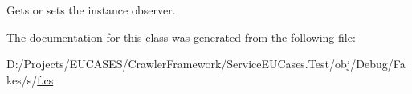 Gets or sets the instance observer.



The documentation for this class was generated from the following file\-:\begin{DoxyCompactItemize}
\item 
D\-:/\-Projects/\-E\-U\-C\-A\-S\-E\-S/\-Crawler\-Framework/\-Service\-E\-U\-Cases.\-Test/obj/\-Debug/\-Fakes/s/\hyperlink{s_2f_8cs}{f.\-cs}\end{DoxyCompactItemize}
